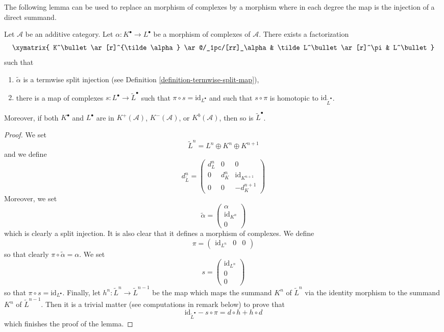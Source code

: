 \noindent
The following lemma can be used to replace an morphism of complexes
by a morphism where in each degree the map is the injection of a
direct summand.

\begin{lemma}
\label{lemma-make-injective}
Let $\mathcal{A}$ be an additive category.
Let $\alpha : K^\bullet \to L^\bullet$ be a morphism
of complexes of $\mathcal{A}$.
There exists a factorization
$$
\xymatrix{
K^\bullet \ar[r]^{\tilde \alpha} \ar@/_1pc/[rr]_\alpha &
\tilde L^\bullet \ar[r]^\pi &
L^\bullet
}
$$
such that
\begin{enumerate}
\item $\tilde \alpha$ is a termwise split injection (see
Definition \ref{definition-termwise-split-map}),
\item there is a map of complexes $s : L^\bullet \to \tilde L^\bullet$
such that $\pi \circ s = \text{id}_{L^\bullet}$ and such that
$s \circ \pi$ is homotopic to $\text{id}_{\tilde L^\bullet}$.
\end{enumerate}
Moreover, if both $K^\bullet$ and $L^\bullet$ are in
$K^{+}(\mathcal{A})$, $K^{-}(\mathcal{A})$, or $K^b(\mathcal{A})$,
then so is $\tilde L^\bullet$.
\end{lemma}

\begin{proof}
We set
$$
\tilde L^n = L^n \oplus K^n \oplus K^{n + 1}
$$
and we define
$$
d^n_{\tilde L} =
\left(
\begin{matrix}
d^n_L & 0 & 0 \\
0 & d^n_K & \text{id}_{K^{n + 1}} \\
0 & 0 & -d^{n + 1}_K
\end{matrix}
\right)
$$
Moreover, we set
$$
\tilde \alpha =
\left(
\begin{matrix}
\alpha \\
\text{id}_{K^n} \\
0
\end{matrix}
\right)
$$
which is clearly a split injection. It is also clear that it defines a morphism
of complexes. We define
$$
\pi =
\left(
\begin{matrix}
\text{id}_{L^n} &
0 &
0
\end{matrix}
\right)
$$
so that clearly $\pi \circ \tilde \alpha = \alpha$. We set
$$
s =
\left(
\begin{matrix}
\text{id}_{L^n} \\
0 \\
0
\end{matrix}
\right)
$$
so that $\pi \circ s = \text{id}_{L^\bullet}$. Finally,
let $h^n : \tilde L^n \to \tilde L^{n - 1}$ be the map
which maps the summand $K^n$ of $\tilde L^n$ via the identity morphism
to the summand $K^n$ of $\tilde L^{n - 1}$. Then it is a trivial matter
(see computations in remark below) to prove that
$$
\text{id}_{\tilde L^\bullet} - s \circ \pi
=
d \circ h + h \circ d
$$
which finishes the proof of the lemma.
\end{proof}

